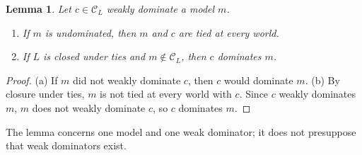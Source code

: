 \documentclass[11pt]{article}
\newtheorem{lemma}[theorem]{Lemma}
\theoremstyle{definition}
\theoremstyle{remark}
\newcommand{\C}{\mathcal C}
\begin{document}
\begin{lemma}\label{lem:ties}
Let $c\in\C_L$ weakly dominate a model $m$.
\begin{enumerate}[label=(\alph*)]
\item If $m$ is undominated, then $m$ and $c$ are tied at every world.
\item If $L$ is closed under ties and $m\notin\C_L$, then $c$ dominates $m$.
\end{enumerate}
\end{lemma}
\begin{proof}
(a) If $m$ did not weakly dominate $c$, then $c$ would dominate $m$. (b) By closure under ties, $m$ is not tied at every world with $c$. Since $c$ weakly dominates $m$, $m$ does not weakly dominate $c$, so $c$ dominates $m$.
\end{proof}
The lemma concerns one model and one weak dominator; it does not presuppose that weak dominators exist.
\end{document}
